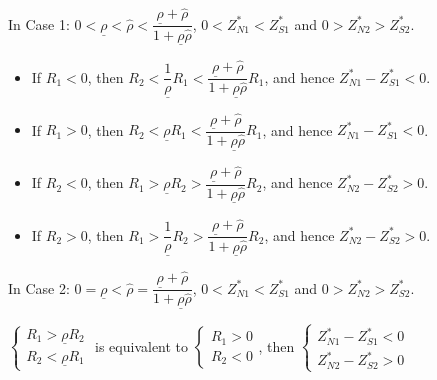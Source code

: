 \documentclass[10pt]{article}
\begin{document}
In Case 1: $ 0 < \underline{\rho} < {\hat \rho} < \dfrac{\underline{\rho} + {\hat \rho}}{1 + \underline{\rho} {\hat \rho}} $, $ 0 < Z_{N 1}^* < Z_{S 1}^* $ and $ 0 > Z_{N 2}^* > Z_{S 2}^* $.
\begin{itemize}
\item If $ R_1 < 0 $, then $ R_2 < \dfrac{1}{\underline{\rho}} R_1 < \dfrac{\underline{\rho} + {\hat \rho}}{1 + \underline{\rho} {\hat \rho}} R_1 $, and hence $ Z_{N 1}^* - Z_{S 1}^* < 0 $.
\item If $ R_1 > 0 $, then $ R_2 < \underline{\rho} R_1 < \dfrac{\underline{\rho} + {\hat \rho}}{1 + \underline{\rho} {\hat \rho}} R_1 $, and hence $ Z_{N 1}^* - Z_{S 1}^* < 0 $.
\item If $ R_2 < 0 $, then $ R_1 > \underline{\rho} R_2 > \dfrac{\underline{\rho} + {\hat \rho}}{1 + \underline{\rho} {\hat \rho}} R_2 $, and hence $ Z_{N 2}^* - Z_{S 2}^* > 0 $.
\item If $ R_2 > 0 $, then $ R_1 > \dfrac{1}{\underline{\rho}} R_2 > \dfrac{\underline{\rho} + {\hat \rho}}{1 + \underline{\rho} {\hat \rho}} R_2 $, and hence $ Z_{N 2}^* - Z_{S 2}^* > 0 $.
\end{itemize}

In Case 2: $ 0 = \underline{\rho} < {\hat \rho} = \dfrac{\underline{\rho} + {\hat \rho}}{1 + \underline{\rho} {\hat \rho}} $, $ 0 < Z_{N 1}^* < Z_{S 1}^* $ and $ 0 > Z_{N 2}^* > Z_{S 2}^* $.

$ \left\{ \begin{matrix} R_1 > \underline{\rho} R_2 \\ R_2 < \underline{\rho} R_1 \end{matrix} \right. $ is equivalent to $ \left\{ \begin{matrix} R_1 > 0 \\ R_2 < 0 \end{matrix} \right. $, then $ \left\{ \begin{matrix} Z_{N 1}^* - Z_{S 1}^* < 0 \\ Z_{N 2}^* - Z_{S 2}^* > 0 \end{matrix} \right. $
\end{document}
